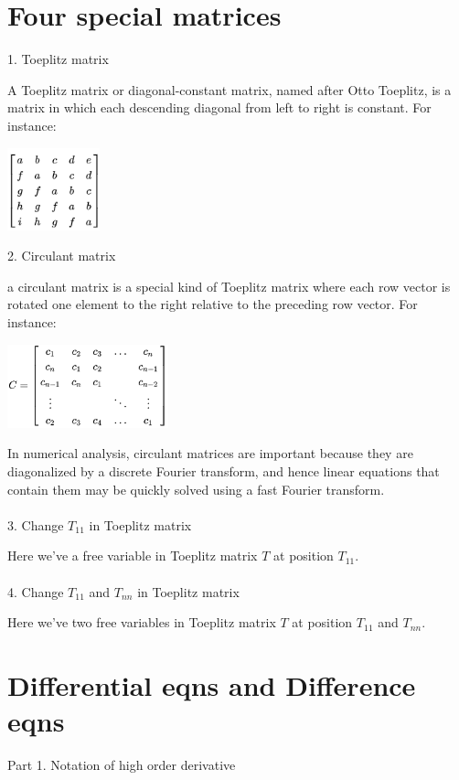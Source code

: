 \documentclass{article}
\begin{document}
\begin{spacing}{1.5}
\section{Four special matrices}
1. Toeplitz matrix

A Toeplitz matrix or diagonal-constant matrix, named after Otto Toeplitz, is a matrix in which each descending diagonal from left to right is constant. For instance:
\\\begin{center}
	\includegraphics[width=0.2\textwidth]{Toeplitz_matrix1.png} \\ 
\end{center}
2. Circulant matrix

a circulant matrix is a special kind of Toeplitz matrix where each row vector is rotated one element to the right relative to the preceding row vector. For instance:
\\\begin{center}
	\includegraphics[width=0.35\textwidth]{circulant_matrix.png}
\end{center}

In numerical analysis, circulant matrices are important because they are diagonalized by a discrete Fourier transform, and hence linear equations that contain them may be quickly solved using a fast Fourier transform.
\\\\3. Change $T_{11}$ in Toeplitz matrix

Here we've a free variable in Toeplitz matrix $T$ at position $T_{11}$.
\\\\4. Change $T_{11}$ and $T_{nn}$ in Toeplitz matrix

Here we've two free variables in Toeplitz matrix $T$ at position $T_{11}$ and $T_{nn}$.


\section{Differential eqns and Difference eqns}
Part 1. Notation of high order derivative


\end{spacing}
\end{document}
